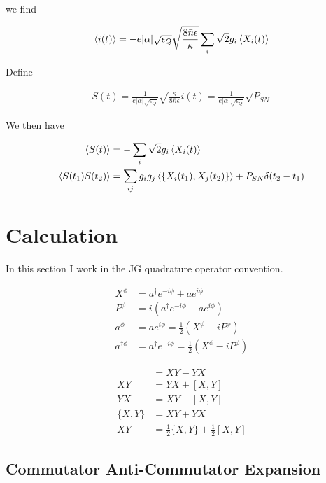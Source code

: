 \documentclass[12pt]{article}
\newcommand{\ep}{\epsilon}
\begin{document}
we find

\begin{align}
\Braket{i(t)} = -e|\alpha|\sqrt{\ep_Q} \sqrt{\frac{8\bar{n}\ep}{\kappa}} \sum_i \sqrt{2}g_i\Braket{X_i(t)}
\end{align}

Define

\begin{align}
S(t) = \frac{1}{e|\alpha|\sqrt{\ep_Q}} \sqrt{\frac{\kappa}{8\bar{n}\ep}} i(t) = \frac{1}{e|\alpha|\sqrt{\ep_Q}} \sqrt{P_{SN}}
\end{align}

We then have

\begin{align}
\Braket{S(t)} &= -\sum_i \sqrt{2}g_i\Braket{X_i(t)}\\
\Braket{S(t_1)S(t_2)} &= \sum_{ij}g_ig_j \Braket{\left\{X_i(t_1), X_j(t_2)\right\}} + P_{SN}\delta(t_2-t_1)
\end{align}

\section{Calculation}

In this section I work in the JG quadrature operator convention.

\begin{align}
X^{\phi} &= a^{\dag}e^{-i\phi} + a e^{i\phi}\\
P^{\phi} &= i(a^{\dag}e^{-i\phi} - a e^{i\phi})\\
a^{\phi} &= ae^{i\phi} = \frac{1}{2}(X^{\phi} + iP^{\phi})\\
a^{\dag \phi} &= a^{\dag}e^{-i\phi} = \frac{1}{2}(X^{\phi}-iP^{\phi})
\end{align}

\begin{align}
[X, Y] &= XY - YX\\
XY &= YX + [X, Y]\\
YX &= XY - [X, Y]\\
\{X, Y\} &= XY + YX\\
XY &= \frac{1}{2}\{X, Y\} + \frac{1}{2}[X, Y]
\end{align}

\subsection{Commutator Anti-Commutator Expansion}
\end{document}
